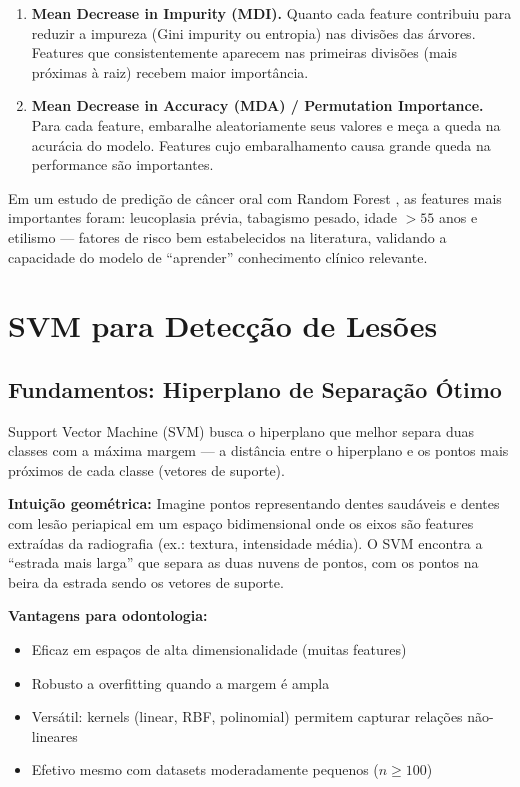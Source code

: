 \begin{enumerate}
    \item \textbf{Mean Decrease in Impurity (MDI).} Quanto cada feature contribuiu para reduzir a impureza (Gini impurity ou entropia) nas divisões das árvores. Features que consistentemente aparecem nas primeiras divisões (mais próximas à raiz) recebem maior importância.
    \item \textbf{Mean Decrease in Accuracy (MDA) / Permutation Importance.} Para cada feature, embaralhe aleatoriamente seus valores e meça a queda na acurácia do modelo. Features cujo embaralhamento causa grande queda na performance são importantes.
\end{enumerate}

Em um estudo de predição de câncer oral com Random Forest \cite{ODT-025}, as features mais importantes foram: leucoplasia prévia, tabagismo pesado, idade $>55$ anos e etilismo — fatores de risco bem estabelecidos na literatura, validando a capacidade do modelo de ``aprender'' conhecimento clínico relevante.

\section{SVM para Detecção de Lesões}

\subsection{Fundamentos: Hiperplano de Separação Ótimo}

Support Vector Machine (SVM)  busca o hiperplano que melhor separa duas classes com a máxima margem — a distância entre o hiperplano e os pontos mais próximos de cada classe (vetores de suporte).

\textbf{Intuição geométrica:} Imagine pontos representando dentes saudáveis e dentes com lesão periapical em um espaço bidimensional onde os eixos são features extraídas da radiografia (ex.: textura, intensidade média). O SVM encontra a ``estrada mais larga'' que separa as duas nuvens de pontos, com os pontos na beira da estrada sendo os vetores de suporte.

\textbf{Vantagens para odontologia:}
\begin{itemize}
    \item Eficaz em espaços de alta dimensionalidade (muitas features)
    \item Robusto a overfitting quando a margem é ampla
    \item Versátil: kernels (linear, RBF, polinomial) permitem capturar relações não-lineares
    \item Efetivo mesmo com datasets moderadamente pequenos ($n \geq 100$)
\end{itemize}

